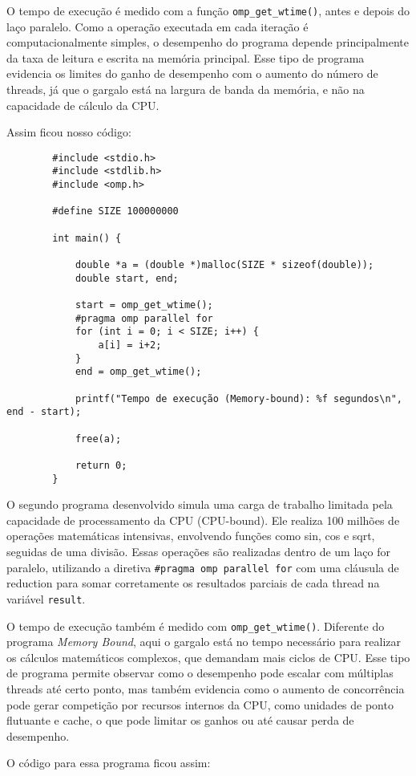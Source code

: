 \documentclass[a4paper, 12pt]{article}
\begin{document}
	O tempo de execução é medido com a função \texttt{omp\_get\_wtime()}, antes e depois do laço paralelo. Como a operação executada em cada iteração é computacionalmente simples, o desempenho do programa depende principalmente da taxa de leitura e escrita na memória principal. Esse tipo de programa evidencia os limites do ganho de desempenho com o aumento do número de threads, já que o gargalo está na largura de banda da memória, e não na capacidade de cálculo da CPU.
	
	Assim ficou nosso código:
	
	\begin{verbatim}
		#include <stdio.h>
		#include <stdlib.h>
		#include <omp.h>
		
		#define SIZE 100000000
		
		int main() {
			
			double *a = (double *)malloc(SIZE * sizeof(double));
			double start, end;
			
			start = omp_get_wtime();
			#pragma omp parallel for
			for (int i = 0; i < SIZE; i++) {
				a[i] = i+2;
			}
			end = omp_get_wtime();
			
			printf("Tempo de execução (Memory-bound): %f segundos\n", end - start);
			
			free(a);
			
			return 0;
		}
	\end{verbatim}
	
	O segundo programa desenvolvido simula uma carga de trabalho limitada pela capacidade de processamento da CPU (CPU-bound). Ele realiza 100 milhões de operações matemáticas intensivas, envolvendo funções como sin, cos e sqrt, seguidas de uma divisão. Essas operações são realizadas dentro de um laço for paralelo, utilizando a diretiva \texttt{\#pragma omp parallel for} com uma cláusula de reduction para somar corretamente os resultados parciais de cada thread na variável \texttt{result}.
	
	O tempo de execução também é medido com \texttt{omp\_get\_wtime()}. Diferente do programa \textit{Memory Bound}, aqui o gargalo está no tempo necessário para realizar os cálculos matemáticos complexos, que demandam mais ciclos de CPU. Esse tipo de programa permite observar como o desempenho pode escalar com múltiplas threads até certo ponto, mas também evidencia como o aumento de concorrência pode gerar competição por recursos internos da CPU, como unidades de ponto flutuante e cache, o que pode limitar os ganhos ou até causar perda de desempenho.
	
	O código para essa programa ficou assim:
	
\end{document}
